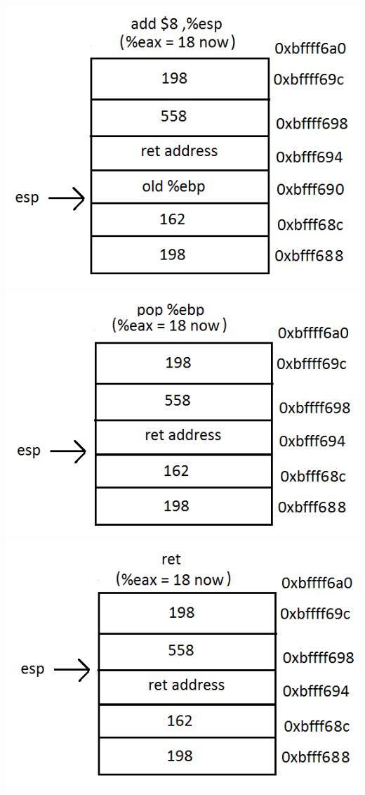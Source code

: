 \documentclass{article}
\begin{document}
\includegraphics[scale=0.5]{stack7.png}  
\includegraphics[scale=0.5]{stack8.png}\\
\includegraphics[scale=0.5]{stack9.png}  
\end{document}
